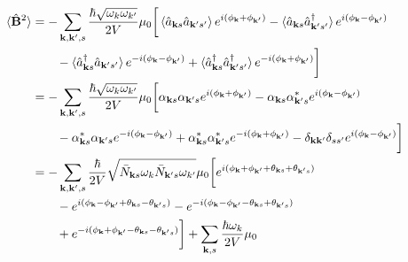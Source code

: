 \documentclass[../../../main.tex]{subfiles}
\begin{document}
\begin{align*}
  \braket{\hat{\mathbf{B}}^2 }
   & =   - \sum_{\mathbf{k},\mathbf{k}', s} \frac{\hbar \sqrt{\omega_k \omega_{k'}}}{2 V}\mu_0
  \bigg[ \braket{\hat{a}_{\mathbf{k }s} \hat{a}_{\mathbf{k }'s'} }  e ^{i(\phi_{\mathbf{k }} +\phi_{\mathbf{k }'})}
  -\braket{\hat{a}_{\mathbf{k }s} \hat{a}^\dagger_{\mathbf{k }'s'}  } e ^{i(\phi_{\mathbf{k }}-\phi_{\mathbf{k }'})}                                                                                     \\
   & \qquad-\braket{\hat{a}^\dagger_{\mathbf{k }s} \hat{a}_{\mathbf{k }'s'} } e ^{-i(\phi_{\mathbf{k }}-\phi_{\mathbf{k }'})}
  +\braket{\hat{a}^\dagger_{\mathbf{k }s} \hat{a}^\dagger_{\mathbf{k }'s'} } e ^{-i(\phi_{\mathbf{k }}+\phi_{\mathbf{k }'})} \bigg]                                                                      \\
   & =   - \sum_{\mathbf{k},\mathbf{k}',s} \frac{\hbar \sqrt{\omega_k \omega_{k'}}}{2 V}\mu_0  \bigg[ \alpha_{\mathbf{k}s} \alpha_{\mathbf{k }' s}e ^{i(\phi_{\mathbf{k }} +\phi_{\mathbf{k }'})}
  -\alpha_{\mathbf{k }s }\alpha_{\mathbf{k' } s }^* e ^{i(\phi_{\mathbf{k }}-\phi_{\mathbf{k }'})}                                                                                                       \\
   & \qquad-\alpha_{\mathbf{k } s}^*\alpha_{\mathbf{k' } s} e ^{-i(\phi_{\mathbf{k }}-\phi_{\mathbf{k }'})}
  +\alpha_{\mathbf{k } s } ^*\alpha_{\mathbf{k' } s}^* e ^{-i(\phi_{\mathbf{k }}+\phi_{\mathbf{k }'})} -\delta_{\mathbf{k }\mathbf{k}'}\delta_{ss'}e ^{i(\phi_{\mathbf{k }}-\phi_{\mathbf{k }'})} \bigg] \\
   & =   - \sum_{\mathbf{k},\mathbf{k}',s} \frac{\hbar }{2 V}\sqrt{\bar{N}_{\mathbf{k }s}\omega_k \bar{N}_{\mathbf{k}' s}\omega_{k'}}\mu_0
  \bigg[ e ^{i(\phi_{\mathbf{k }} +\phi_{\mathbf{k }'}+\theta_{\mathbf{k }s}+\theta_{\mathbf{k }'s})}                                                                                                    \\
   & \qquad -e ^{i(\phi_{\mathbf{k }}-\phi_{\mathbf{k }'} +\theta_{\mathbf{k }s}-\theta_{\mathbf{k }' s})}
  -e ^{-i(\phi_{\mathbf{k }}-\phi_{\mathbf{k }'}-\theta_{\mathbf{k }s}+\theta_{\mathbf{k }' s})}                                                                                                         \\
   & \qquad + e ^{-i(\phi_{\mathbf{k }}+\phi_{\mathbf{k }'}-\theta_{\mathbf{k }s}-\theta_{\mathbf{k }'s})} \bigg]+ \sum_{\mathbf{k },s}\frac{\hbar \omega_k }{2V}\mu_0                                   \\

\end{align*}
\end{document}

